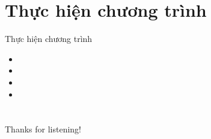 \documentclass{beamer}
\numberwithin{equation}{section}
\begin{document}
\section{Thực hiện chương trình}
\begin{frame}{Thực hiện chương trình}
\begin{itemize}
\item
\item
\item
\item
\end{itemize}
\end{frame}
%


\section*{}
\begin{frame}{}
\centering
\Huge{Thanks for listening!}
\end{frame}
\end{document}
